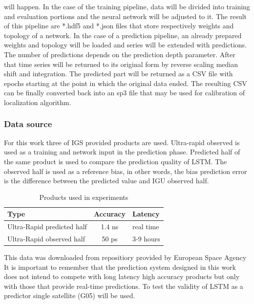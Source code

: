 will happen.
In the case of the training pipeline, data will be divided into training and evaluation
portions and the neural network will be adjusted to it. The result of this pipeline are *.hdf5 and
*.json files that store respectively weights and topology of a network.
In the case of a prediction pipeline, an already prepared weights and topology will be loaded and
series will be extended with predictions. The number of predictions depends on the prediction depth
parameter. After that time series will be returned to its original form by reverse scaling
median shift and integration.
The predicted part will be returned as a CSV file with epochs starting at the point 
in which the original data ended.
The resulting CSV can be finally converted back into an sp3 file that may be used 
for calibration of localization algorithm.

\subsubsection{Data source}
For this work three of IGS provided products are used. Ultra-rapid observed is used as a
training and network input in the prediction phase. Predicted half of the same product 
is used to compare the prediction quality of LSTM.
The observed half is used as a reference bias, in other words, the bias prediction error is
the difference between the predicted value and IGU observed half.
\begin{table}[ht] \label{table:2}
	\parindent0pt
	\caption{Products used in experiments}
	\centering
	\begin{tabular}{lcl}
		\hline
		\hline
		Type &Accuracy &Latency\\  
		\hline 
		Ultra-Rapid predicted half &1.4 ns &real time\\  
		Ultra-Rapid observed half &50 ps & 3-9 hours\\  
		\hline 
		\hline
	\end{tabular}
\end{table}
This data was downloaded from repositiory provided by European Space Agency\cite{ESA}
It is important to remember that the prediction system designed in this work does not intend to 
compete with long latency high accuracy products but only with those that provide 
real-time predictions.
To test the validity of LSTM as a predictor single satellite (G05) will be used.

